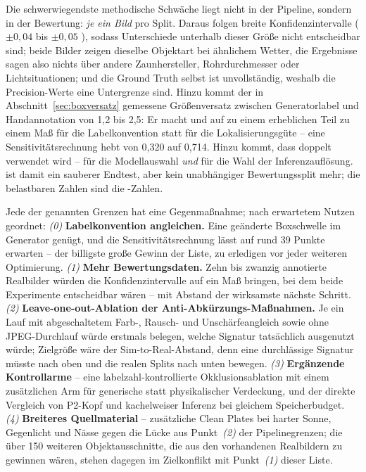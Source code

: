  Die schwerwiegendste methodische Schwäche liegt
nicht in der Pipeline, sondern in der Bewertung: \emph{je ein Bild} pro Split.
Daraus folgen breite Konfidenzintervalle ($\pm 0{,}04$ bis $\pm 0{,}05$
\mAPfifty{}), sodass Unterschiede unterhalb dieser Größe nicht entscheidbar sind;
beide Bilder zeigen dieselbe Objektart bei ähnlichem Wetter, die Ergebnisse sagen
also nichts über andere Zaunhersteller, Rohrdurchmesser oder Lichtsituationen;
und die Ground Truth selbst ist unvollständig, weshalb die Precision-Werte eine
Untergrenze sind. Hinzu kommt der in Abschnitt~\ref{sec:boxversatz} gemessene
Größenversatz zwischen Generatorlabel und Handannotation von 1,2 bis 2,5\px:
Er macht \mAPseven{} und \mAPall{} auf  zu einem erheblichen Teil zu
einem Maß für die Labelkonvention statt für die Lokalisierungsgüte -- eine
Sensitivitätsrechnung hebt \mAPseven{} von 0,320 auf 0,714. Hinzu kommt, dass  doppelt verwendet wird -- für die
Modellauswahl \emph{und} für die Wahl der Inferenzauflösung.  ist
damit ein sauberer Endtest,  aber kein unabhängiger Bewertungssplit
mehr; die belastbaren Zahlen sind die -Zahlen.

 Jede der genannten Grenzen hat eine Gegenmaßnahme;
nach erwartetem Nutzen geordnet: \emph{(0)} \textbf{Labelkonvention angleichen.}
Eine geänderte Boxschwelle im Generator genügt, und die Sensitivitätsrechnung
lässt auf  rund 39 Punkte \mAPseven{} erwarten -- der billigste große
Gewinn der Liste, zu erledigen vor jeder weiteren Optimierung.
\emph{(1)} \textbf{Mehr Bewertungsdaten.} Zehn
bis zwanzig annotierte Realbilder würden die Konfidenzintervalle auf ein Maß
bringen, bei dem beide Experimente entscheidbar wären -- mit Abstand der
wirksamste nächste Schritt. \emph{(2)}
\textbf{Leave-one-out-Ablation der Anti-Abkürzungs-Maßnahmen.} Je ein Lauf mit
abgeschaltetem Farb-, Rausch- und Unschärfeangleich sowie ohne JPEG-Durchlauf
würde erstmals belegen, welche Signatur tatsächlich ausgenutzt würde; Zielgröße
wäre der Sim-to-Real-Abstand, denn eine durchlässige Signatur müsste 
nach oben und die realen Splits nach unten bewegen. \emph{(3)} \textbf{Ergänzende
Kontrollarme} -- eine labelzahl-kontrollierte Okklusionsablation mit einem
zusätzlichen Arm für generische statt physikalischer Verdeckung, und der direkte
Vergleich von P2-Kopf und kachelweiser Inferenz \parencite{akyon2022sahi} bei
gleichem Speicherbudget. \emph{(4)} \textbf{Breiteres Quellmaterial} -- zusätzliche
Clean Plates bei harter Sonne, Gegenlicht und Nässe gegen die Lücke aus
Punkt~\emph{(2)} der Pipelinegrenzen; die über 150 weiteren Objektausschnitte,
die aus den vorhandenen Realbildern zu gewinnen wären, stehen dagegen im
Zielkonflikt mit Punkt~\emph{(1)} dieser Liste.

